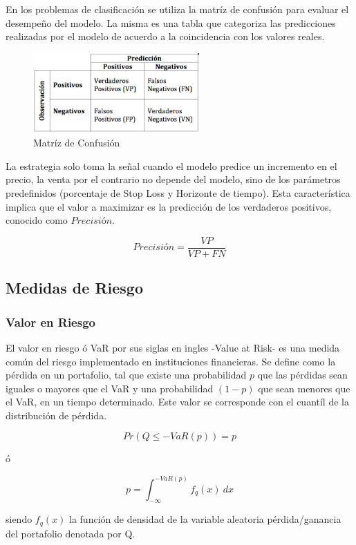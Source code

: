 \documentclass[a4paper,12pt]{Latex/Classes/PhDthesisPSnPDF}
\begin{document}
En los problemas de clasificación se utiliza la matríz de confusión para evaluar el desempeño del modelo. La misma es una tabla que categoriza las predicciones realizadas por el modelo de acuerdo a la coincidencia con los valores reales. 

\begin{figure}[ht]
\begin{center}
\includegraphics[width=2.5in]{images/confusion_matrix}
\end{center}
\caption{Matríz de Confusión}
\end{figure}

La estrategia solo toma la señal cuando el modelo predice un incremento en el precio, la venta por el contrario no depende del modelo, sino de los parámetros predefinidos (porcentaje de Stop Loss y Horizonte de tiempo). Esta característica implica que el valor a maximizar es la predicción de los verdaderos positivos, conocido como $Precisión$.

$$ Precisión = \frac{VP}{VP + FN} $$

\subsection{Medidas de Riesgo}

\subsubsection{Valor en Riesgo}

El valor en riesgo ó VaR por sus siglas en ingles -Value at Risk- es una medida común del riesgo implementado en instituciones financieras. Se define como la pérdida en un portafolio, tal que existe una probabilidad $p$ que las pérdidas sean iguales o mayores que el VaR y una probabilidad $(1-p)$ que sean menores que el VaR, en un tiempo determinado. Este valor se corresponde con el cuantíl de la distribución de pérdida. 

$$ Pr(Q \leq -VaR(p)) = p $$

ó

$$ p = \int_{-\infty}^{-VaR(p)}f_{q}(x)\ dx $$

siendo $f_{q}(x)$ la función de densidad de la variable aleatoria pérdida/ganancia del portafolio denotada por Q.
\end{document}
